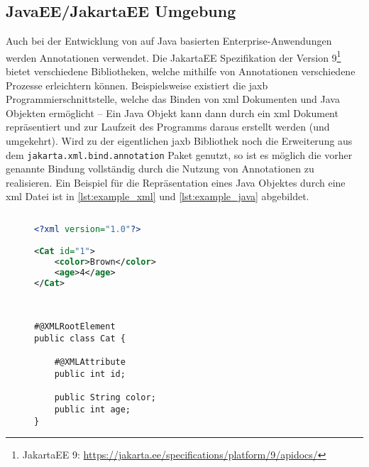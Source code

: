 \subsection{JavaEE/JakartaEE Umgebung}
\label{verwendung_im_umfeld_von_java_ee}
Auch bei der Entwicklung von auf Java basierten Enterprise-Anwendungen werden Annotationen verwendet. Die JakartaEE Spezifikation der Version 9\footnote{JakartaEE 9: \url{https://jakarta.ee/specifications/platform/9/apidocs/}} bietet verschiedene Bibliotheken, welche mithilfe von Annotationen verschiedene Prozesse erleichtern können. Beispielsweise existiert die \ac{jaxb} Programmierschnittstelle, welche das Binden von \ac{xml} Dokumenten und Java Objekten ermöglicht -- Ein Java Objekt kann dann durch ein \ac{xml} Dokument repräsentiert und zur Laufzeit des Programms daraus erstellt werden (und umgekehrt). Wird zu der eigentlichen \ac{jaxb} Bibliothek noch die Erweiterung aus dem \texttt{jakarta.xml.bind.annotation} Paket genutzt, so ist es möglich die vorher genannte Bindung vollständig durch die Nutzung von Annotationen zu realisieren. Ein Beispiel für die Repräsentation eines Java Objektes durch eine \ac{xml} Datei ist in \autoref{lst:example_xml} und \autoref{lst:example_java} abgebildet.

\begin{figure}[H]
	\noindent
	\begin{adjustbox}{minipage=[t]{.45\linewidth},gstore totalheight=\heightone,margin=\fboxsep+\fboxrule}
		\begin{lstlisting}[caption=Repräsentation als XML Datei, captionpos=b, language=XML, label=lst:example_xml]
	
<?xml version="1.0"?>

<Cat id="1">
	<color>Brown</color>
	<age>4</age>
</Cat>	

	
		\end{lstlisting}
	\end{adjustbox}\hfill
	\begin{adjustbox}{minipage=[t][\heightone]{0.5\linewidth}}
		\begin{lstlisting}[caption=Repräsentation als Java Objekt, captionpos=b, label=lst:example_java]
#@XMLRootElement
public class Cat {

	#@XMLAttribute
	public int id;
	
	public String color;
	public int age;
}
		\end{lstlisting}
	\end{adjustbox}
\end{figure}

